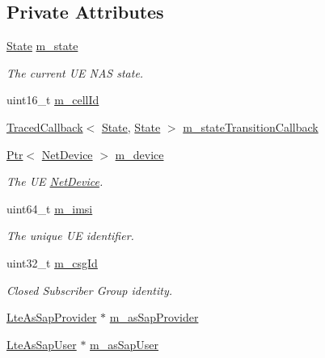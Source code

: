 \subsection*{Private Attributes}
\begin{DoxyCompactItemize}
\item 
\hyperlink{classns3_1_1EpcUeNas_a8047255fecfac11c9e1abe6f13d527dc}{State} \hyperlink{classns3_1_1EpcUeNas_a1717ecab2177c959111e14fdad7972d0}{m\+\_\+state}
\begin{DoxyCompactList}\small\item\em The current UE N\+AS state. \end{DoxyCompactList}\item 
uint16\+\_\+t \hyperlink{classns3_1_1EpcUeNas_aa23eaa05bad623272c691a05515efd0f}{m\+\_\+cell\+Id}
\item 
\hyperlink{classns3_1_1TracedCallback}{Traced\+Callback}$<$ \hyperlink{classns3_1_1EpcUeNas_a8047255fecfac11c9e1abe6f13d527dc}{State}, \hyperlink{classns3_1_1EpcUeNas_a8047255fecfac11c9e1abe6f13d527dc}{State} $>$ \hyperlink{classns3_1_1EpcUeNas_a4a1b413f7ae25d1f74295fa2a76d55d3}{m\+\_\+state\+Transition\+Callback}
\item 
\hyperlink{classns3_1_1Ptr}{Ptr}$<$ \hyperlink{classns3_1_1NetDevice}{Net\+Device} $>$ \hyperlink{classns3_1_1EpcUeNas_ab873c88a58c003b9756e1f65661e45e3}{m\+\_\+device}
\begin{DoxyCompactList}\small\item\em The UE \hyperlink{classns3_1_1NetDevice}{Net\+Device}. \end{DoxyCompactList}\item 
uint64\+\_\+t \hyperlink{classns3_1_1EpcUeNas_a0d541bfcaf7775052a7889bbd706fe02}{m\+\_\+imsi}
\begin{DoxyCompactList}\small\item\em The unique UE identifier. \end{DoxyCompactList}\item 
uint32\+\_\+t \hyperlink{classns3_1_1EpcUeNas_a5b08a427d4ff0ded01a32ad92c24f015}{m\+\_\+csg\+Id}
\begin{DoxyCompactList}\small\item\em Closed Subscriber Group identity. \end{DoxyCompactList}\item 
\hyperlink{classns3_1_1LteAsSapProvider}{Lte\+As\+Sap\+Provider} $\ast$ \hyperlink{classns3_1_1EpcUeNas_a989e75be6c48906d2b2deb55147a10fd}{m\+\_\+as\+Sap\+Provider}
\item 
\hyperlink{classns3_1_1LteAsSapUser}{Lte\+As\+Sap\+User} $\ast$ \hyperlink{classns3_1_1EpcUeNas_a3bcab901228efd5145885dc07b47c5dd}{m\+\_\+as\+Sap\+User}

\end{DoxyCompactItemize}
